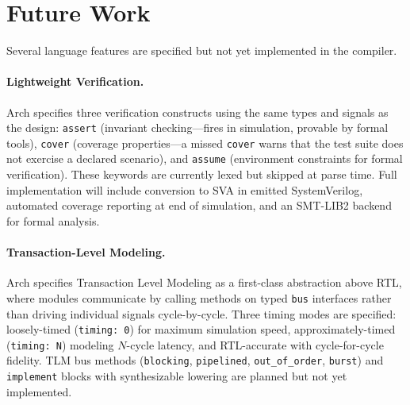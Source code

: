 \documentclass[11pt,twocolumn]{article}
\begin{document}
\section{Future Work}\label{sec:future}

Several language features are specified but not yet implemented in the compiler.

\paragraph{Lightweight Verification.}
Arch specifies three verification constructs using the same types and signals as the design: \texttt{assert} (invariant checking---fires in simulation, provable by formal tools), \texttt{cover} (coverage properties---a missed \texttt{cover} warns that the test suite does not exercise a declared scenario), and \texttt{assume} (environment constraints for formal verification). These keywords are currently lexed but skipped at parse time. Full implementation will include conversion to SVA in emitted SystemVerilog, automated coverage reporting at end of simulation, and an SMT-LIB2 backend for formal analysis.

\paragraph{Transaction-Level Modeling.}
Arch specifies Transaction Level Modeling as a first-class abstraction above RTL, where modules communicate by calling methods on typed \texttt{bus} interfaces rather than driving individual signals cycle-by-cycle. Three timing modes are specified: loosely-timed (\texttt{timing: 0}) for maximum simulation speed, approximately-timed (\texttt{timing: N}) modeling $N$-cycle latency, and RTL-accurate with cycle-for-cycle fidelity. TLM bus methods (\texttt{blocking}, \texttt{pipelined}, \texttt{out\_of\_order}, \texttt{burst}) and \texttt{implement} blocks with synthesizable lowering are planned but not yet implemented.
\end{document}
